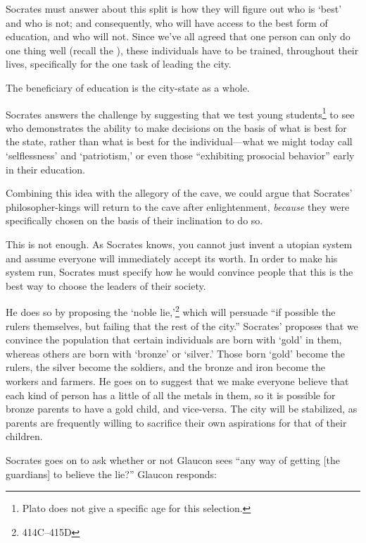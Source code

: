  Socrates must answer about this split is how they will figure out who is `best' and who is not; and consequently, who will have access to the best form of education, and who will not. Since we've all agreed that one person can only do one thing well (recall the ), these individuals have to be trained, throughout their lives, specifically for the one task of leading the city.\begin{objects}
\label{platoobjects}The beneficiary of education is the city-state as a whole.
\end{objects}


Socrates answers the challenge by suggesting that we test young students\footnote{Plato does not give a specific age for this selection.} to see who demonstrates the ability to make decisions on the basis of what is best for the state, rather than what is best for the individual---what we might today call `selflessness' and `patriotism,' or even those ``exhibiting prosocial behavior'' early in their education. 

Combining this idea with the allegory of the cave, we could argue that Socrates' philosopher-kings will return to the cave after enlightenment, \emph{because} they were specifically chosen on the basis of their inclination to do so.

This is not enough. As Socrates knows, you cannot just invent a utopian system and assume everyone will immediately accept its worth. In order to make his system run, Socrates must specify how he would convince people that this is the best way to choose the leaders of their society.

He does so by proposing the `noble lie,'\footnote{414C--415D} which will persuade ``if possible the rulers themselves, but failing that the rest of the city.'' Socrates' proposes that we convince the population that certain individuals are born with `gold' in them, whereas others are born with `bronze' or `silver.' Those born `gold' become the rulers, the silver become the soldiers, and the bronze and iron become the workers and farmers. He goes on to suggest that we make everyone believe that each kind of person has a little of all the metals in them, so it is possible for bronze parents to have a gold child, and vice-versa. The city will be stabilized, as parents are frequently willing to sacrifice their own aspirations for that of their children.

Socrates goes on to ask whether or not Glaucon sees ``any way of getting [the guardians] to believe the lie?'' Glaucon responds: 

